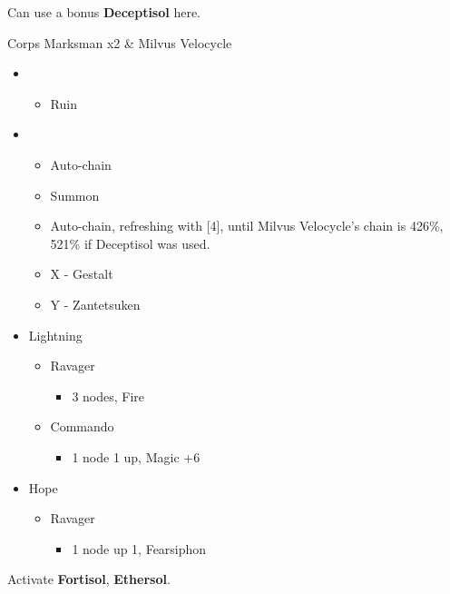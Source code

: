 \begin{multicols}{2}
  Can use a bonus \textbf{Deceptisol} here.
\vfill

\begin{battle}{Corps Marksman x2 \& Milvus Velocycle}
\begin{itemize}
    \item \first
    \begin{itemize}
        \item Ruin
    \end{itemize}
    \item \fifth
    \begin{itemize}
        \item Auto-chain
        \item Summon
        \item Auto-chain, refreshing with [4], until Milvus Velocycle's chain is 426\%, 521\% if Deceptisol was used.
        \item X - Gestalt
        \item Y - Zantetsuken
    \end{itemize}
\end{itemize}
\end{battle}
\begin{menu}
\begin{itemize}
    \crystarium
    \begin{itemize}
        \item Lightning
        \begin{itemize}
            \item Ravager
            \begin{itemize}
                \item 3 nodes, Fire
            \end{itemize}
            \item Commando
            \begin{itemize}
                \item 1 node 1 up, Magic +6
            \end{itemize}
        \end{itemize}
        \columnbreak
        \item Hope
        \begin{itemize}
           \item Ravager
           \begin{itemize}
               \item 1 node up 1, Fearsiphon
           \end{itemize}
        \end{itemize}
    \end{itemize}
\end{itemize}
\end{menu}
Activate \textbf{Fortisol}, \textbf{Ethersol}.
\end{multicols}

